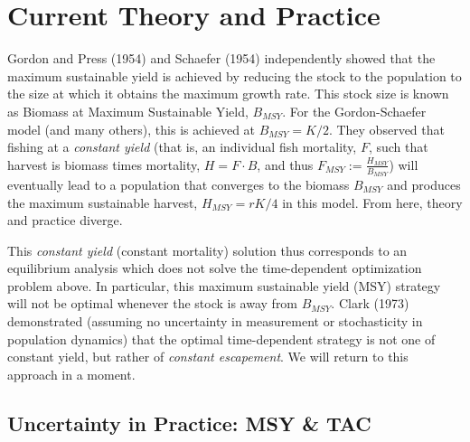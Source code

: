 \documentclass[3p]{elsarticle} %
\begin{document}
\hypertarget{current-theory-and-practice}{%
\section{Current Theory and
Practice}\label{current-theory-and-practice}}

Gordon and Press (1954) and Schaefer (1954) independently showed that
the maximum sustainable yield is achieved by reducing the stock to the
population to the size at which it obtains the maximum growth rate. This
stock size is known as Biomass at Maximum Sustainable Yield,
\(B_{MSY}\). For the Gordon-Schaefer model (and many others), this is
achieved at \(B_{MSY} = K/2\). They observed that fishing at a
\emph{constant yield} (that is, an individual fish mortality, \(F\),
such that harvest is biomass times mortality, \(H = F \cdot B\), and
thus \(F_{MSY} := \tfrac{H_{MSY}}{B_{MSY}}\)) will eventually lead to a
population that converges to the biomass \(B_{MSY}\) and produces the
maximum sustainable harvest, \(H_{MSY} = r K / 4\) in this model. From
here, theory and practice diverge.

This \emph{constant yield} (constant mortality) solution thus
corresponds to an equilibrium analysis which does not solve the
time-dependent optimization problem above. In particular, this maximum
sustainable yield (MSY) strategy will not be optimal whenever the stock
is away from \(B_{MSY}\). Clark (1973) demonstrated (assuming no
uncertainty in measurement or stochasticity in population dynamics) that
the optimal time-dependent strategy is not one of constant yield, but
rather of \emph{constant escapement}. We will return to this approach in
a moment.

\hypertarget{uncertainty-in-practice-msy-tac}{%
\subsection{Uncertainty in Practice: MSY \&
TAC}\label{uncertainty-in-practice-msy-tac}}
\end{document}
